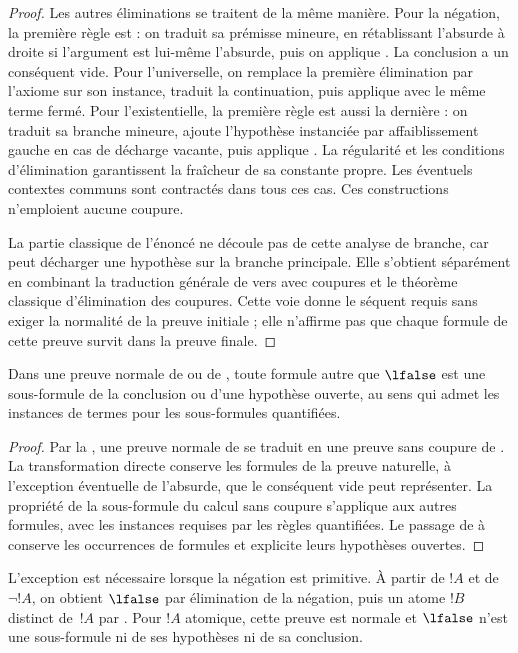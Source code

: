 \documentclass[../../../include/open-logic-section]{subfiles}
\begin{document}
\begin{proof}
Les autres éliminations se traitent de
la même manière. Pour la négation,
la première règle est \Elim{\lnot} :
on traduit sa prémisse mineure, en
rétablissant l'absurde à droite si
l'argument est lui-même l'absurde,
puis on applique \LeftR{\lnot}.
La conclusion a un conséquent vide.
Pour l'universelle, on remplace la
première élimination par l'axiome
sur son instance, traduit la continuation,
puis applique \LeftR{\lforall} avec
le même terme fermé.
Pour l'existentielle, la première règle
est aussi la dernière : on traduit sa
branche mineure, ajoute l'hypothèse
instanciée par affaiblissement gauche
en cas de décharge vacante, puis applique
\LeftR{\lexists}. La régularité et les
conditions d'élimination garantissent
la fraîcheur de sa constante propre.
Les éventuels contextes communs sont
contractés dans tous ces cas.
Ces constructions n'emploient aucune
coupure.

La partie classique de l'énoncé ne
découle pas de cette analyse de branche,
car~\FalseCl{} peut décharger une
hypothèse sur la branche principale.
Elle s'obtient séparément en combinant
la traduction générale de 
vers  avec coupures et le
théorème classique d'élimination des
coupures. Cette voie donne le séquent
requis sans exiger la normalité de la
preuve initiale ; elle n'affirme pas
que chaque formule de cette preuve
survit dans la preuve finale.
\end{proof}

\begin{cor}
Dans une preuve normale de  ou
de , toute formule autre que
$\lfalse$ est une sous-formule de la
conclusion ou d'une hypothèse ouverte,
au sens qui admet les instances de
termes pour les sous-formules quantifiées.
\end{cor}

\begin{proof}
Par la , une
preuve normale de  se traduit
en une preuve sans coupure de .
La transformation directe conserve les
formules de la preuve naturelle, à
l'exception éventuelle de l'absurde,
que le conséquent vide peut représenter.
La propriété de la sous-formule du calcul
sans coupure s'applique aux autres
formules, avec les instances requises
par les règles quantifiées.
Le passage de  à 
conserve les occurrences de formules
et explicite leurs hypothèses ouvertes.
\end{proof}

L'exception est nécessaire lorsque la
négation est primitive. À partir de
$!A$ et de $\lnot !A$, on obtient
$\lfalse$ par élimination de la négation,
puis un atome $!B$ distinct de~$!A$ par
\FalseInt. Pour $!A$ atomique, cette
preuve est normale et $\lfalse$ n'est
une sous-formule ni de ses hypothèses
%
%
%
%
%
%
%
%
%
%
%
%
%
%
%
%
%
%
%
%
%
ni de sa conclusion.
\end{document}
